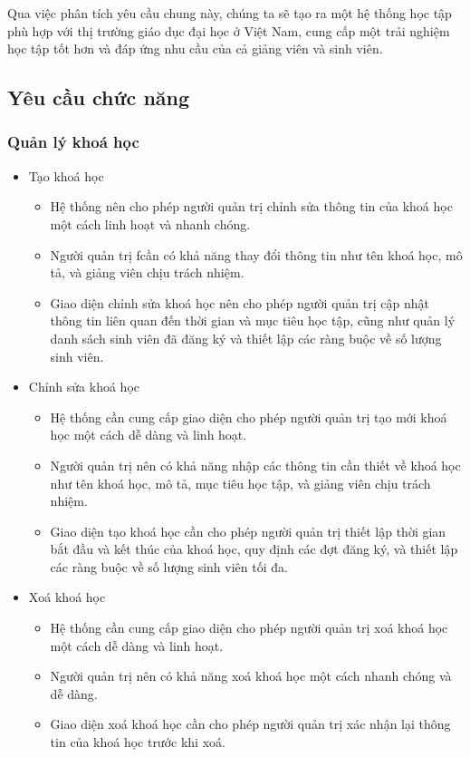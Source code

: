 \documentclass[../Thesis.tex]{subfiles}
\begin{document}
        Qua việc phân tích yêu cầu chung này, chúng ta sẽ tạo ra một hệ thống học tập phù hợp với thị trường giáo dục đại học ở Việt Nam, cung cấp một trải nghiệm học tập tốt hơn và đáp ứng nhu cầu của cả giảng viên và sinh viên.  
    
    \subsection{Yêu cầu chức năng}
        \subsubsection{Quản lý khoá học}
            \begin{itemize}
                \item Tạo khoá học
                    \begin{itemize}
                        \item Hệ thống nên cho phép người quản trị chỉnh sửa thông tin của khoá học một cách linh hoạt và nhanh chóng.
                        \item Người quản trị ƒcần có khả năng thay đổi thông tin như tên khoá học, mô tả, và giảng viên chịu trách nhiệm.
                        \item Giao diện chỉnh sửa khoá học nên cho phép người quản trị cập nhật thông tin liên quan đến thời gian và mục tiêu học tập, cũng như quản lý danh sách sinh viên đã đăng ký và thiết lập các ràng buộc về số lượng sinh viên.
                    \end{itemize}

                \item Chỉnh sửa khoá học
                    \begin{itemize}
                        \item Hệ thống cần cung cấp giao diện cho phép người quản trị tạo mới khoá học một cách dễ dàng và linh hoạt.
                        \item Người quản trị nên có khả năng nhập các thông tin cần thiết về khoá học như tên khoá học, mô tả, mục tiêu học tập, và giảng viên chịu trách nhiệm.
                        \item Giao diện tạo khoá học cần cho phép người quản trị thiết lập thời gian bắt đầu và kết thúc của khoá học, quy định các đợt đăng ký, và thiết lập các ràng buộc về số lượng sinh viên tối đa.
                    \end{itemize}
                \item Xoá khoá học
                    \begin{itemize}
                        \item Hệ thống cần cung cấp giao diện cho phép người quản trị xoá khoá học một cách dễ dàng và linh hoạt.
                        \item Người quản trị nên có khả năng xoá khoá học một cách nhanh chóng và dễ dàng.
                        \item Giao diện xoá khoá học cần cho phép người quản trị xác nhận lại thông tin của khoá học trước khi xoá.
                    \end{itemize}
            \end{itemize}
\end{document}
